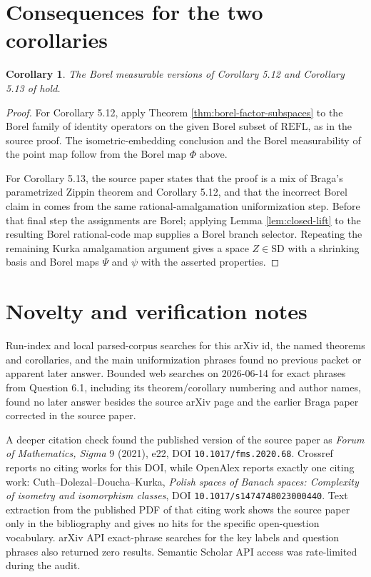 \documentclass[11pt]{article}
\newtheorem{corollary}{Corollary}
\newcommand{\SD}{\mathrm{SD}}
\newcommand{\REFL}{\mathrm{REFL}}
\begin{document}
\section*{Consequences for the two corollaries}

\begin{corollary}
The Borel measurable versions of Corollary 5.12 and Corollary 5.13 of
\cite{AntunesBeanlandBraga} hold.
\end{corollary}

\begin{proof}
For Corollary 5.12, apply Theorem \ref{thm:borel-factor-subspaces} to the
Borel family of identity operators on the given Borel subset of $\REFL$,
as in the source proof. The isometric-embedding conclusion and the Borel
measurability of the point map follow from the Borel map $\Phi$ above.

For Corollary 5.13, the source paper states that the proof is a mix of
Braga's parametrized Zippin theorem \cite{Braga2015} and Corollary 5.12, and
that the incorrect Borel claim in \cite{Braga2015} comes from the same
rational-amalgamation uniformization step. Before that final step the
assignments are Borel; applying Lemma \ref{lem:closed-lift} to the resulting
Borel rational-code map supplies a Borel branch selector. Repeating the
remaining Kurka amalgamation argument gives a space $Z\in\SD$ with a shrinking
basis and Borel maps $\Psi$ and $\psi$ with the asserted properties.
\end{proof}

\section*{Novelty and verification notes}

Run-index and local parsed-corpus searches for this arXiv id, the named
theorems and corollaries, and the main uniformization phrases found no previous
packet or apparent later answer. Bounded web searches on 2026-06-14 for exact
phrases from Question 6.1, including its theorem/corollary numbering and author
names, found no later answer besides the source arXiv page and the earlier
Braga paper corrected in the source paper.

A deeper citation check found the published version of the source paper as
\emph{Forum of Mathematics, Sigma} 9 (2021), e22, DOI
\texttt{10.1017/fms.2020.68}. Crossref reports no citing works for this DOI,
while OpenAlex reports exactly one citing work: Cuth--Dolezal--Doucha--Kurka,
\emph{Polish spaces of Banach spaces: Complexity of isometry and isomorphism
classes}, DOI \texttt{10.1017/s1474748023000440}. Text extraction from the
published PDF of that citing work shows the source paper only in the
bibliography and gives no hits for the specific open-question vocabulary.
arXiv API exact-phrase searches for the key labels and question phrases also
returned zero results. Semantic Scholar API access was rate-limited during the
audit.
\end{document}

